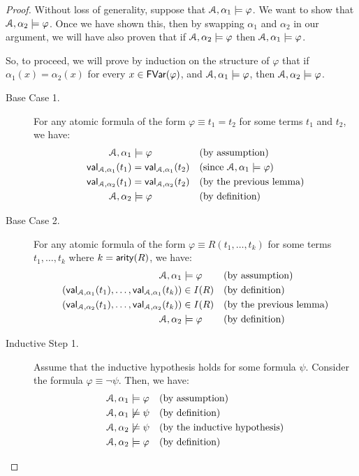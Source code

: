 \documentclass[11pt,usenames, dvipsnames]{article}
\begin{document}
\begin{proof}
  Without loss of generality, suppose that $\struct, \alpha_1 \models \varphi$. We want to show that $\struct, \alpha_2 \models \varphi$. Once we have shown this, then by swapping $\alpha_1$ and $\alpha_2$ in our argument, we will have also proven that if $\struct, \alpha_2 \models \varphi$ then $\struct, \alpha_1 \models \varphi$.

  So, to proceed, we will prove by induction on the structure of $\varphi$ that if $\alpha_1(x) = \alpha_2(x)$ for every $x \in \mathsf{FVar}(\varphi)$, and $\struct, \alpha_1 \models \varphi$, then $\struct, \alpha_2 \models \varphi$.

  \begin{description}
    \item[Base Case 1.] For any atomic formula of the form $\varphi \equiv t_1 = t_2$ for some terms $t_1$ and $t_2$, we have:
    \begin{align*}
      \struct, \alpha_1 &\models \varphi &&\text{(by assumption)}
      \\
      \val{\struct, \alpha_1}{t_1} &= \val{\struct, \alpha_1}{t_2} &&\text{(since $\struct, \alpha_1 \models \varphi$)}
      \\
      \val{\struct, \alpha_2}{t_1} &= \val{\struct, \alpha_2}{t_2} &&\text{(by the previous lemma)}
      \\
      \struct, \alpha_2 &\models \varphi &&\text{(by definition)}
    \end{align*}

    \item[Base Case 2.] For any atomic formula of the form $\varphi \equiv R(t_1, \ldots, t_k)$ for some terms $t_1, \ldots, t_k$ where $k = \mathsf{arity}(R)$, we have:
    \begin{align*}
      \struct, \alpha_1 &\models \varphi &&\text{(by assumption)}
      \\
      (\val{\struct, \alpha_1}{t_1}, \ldots, \val{\struct, \alpha_1}{t_k}) &\in I(R) &&\text{(by definition)}
      \\
      (\val{\struct, \alpha_2}{t_1}, \ldots, \val{\struct, \alpha_2}{t_k}) &\in I(R) &&\text{(by the previous lemma)}
      \\
      \struct, \alpha_2 &\models \varphi &&\text{(by definition)}
    \end{align*}

    \item[Inductive Step 1.] Assume that the inductive hypothesis holds for some formula $\psi$. Consider the formula $\varphi \equiv \neg \psi$. Then, we have:
    \begin{align*}
      \struct, \alpha_1 &\models \varphi &&\text{(by assumption)}
      \\
      \struct, \alpha_1 &\not\models \psi &&\text{(by definition)}
      \\
      \struct, \alpha_2 &\not\models \psi &&\text{(by the inductive hypothesis)}
      \\
      \struct, \alpha_2 &\models \varphi &&\text{(by definition)}
    \end{align*}


\end{description}
\end{proof}
\end{document}
